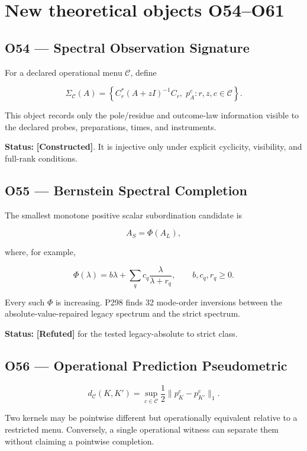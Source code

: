 \documentclass[11pt,a4paper,openany]{report}
\newcommand{\statusRefuted}{\textcolor{finred}{[Refuted]}}
\begin{document}
\chapter{New theoretical objects O54--O61}

\section{O54 --- Spectral Observation Signature}

For a declared operational menu \(\mathcal C\), define

\[
\Sigma_{\mathcal C}(A)
=
\left\{
C_r^\ast(A+zI)^{-1}C_r,\;
p_A^c
:
r,z,c\in\mathcal C
\right\}.
\]

This object records only the pole/\allowbreak{}residue and outcome-law information visible to the declared probes, preparations, times, and instruments.

\textbf{Status:} \textbf{[Constructed]}. It is injective only under explicit cyclicity, visibility, and full-rank conditions.

\section{O55 --- Bernstein Spectral Completion}

The smallest monotone positive scalar subordination candidate is

\[
A_S=\Phi(A_L),
\]

where, for example,

\[
\Phi(\lambda)
=
b\lambda
+\sum_qc_q\frac{\lambda}{\lambda+r_q},
\qquad
b,c_q,r_q\ge0.
\]

Every such \(\Phi\) is increasing. P298 finds 32 mode-order inversions between the absolute-value-repaired legacy spectrum and the strict spectrum.

\textbf{Status:} \textbf{\statusRefuted{}} for the tested legacy-absolute to strict class.

\section{O56 --- Operational Prediction Pseudometric}

\[
d_{\mathcal C}(K,K')
=
\sup_{c\in\mathcal C}
\frac12\|p_K^c-p_{K'}^c\|_1.
\]

Two kernels may be pointwise different but operationally equivalent relative to a restricted menu. Conversely, a single operational witness can separate them without claiming a pointwise completion.
\end{document}
